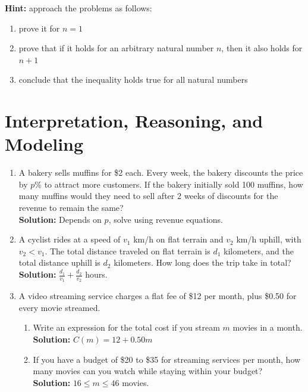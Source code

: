 \documentclass{article}
\begin{document}
\textbf{Hint:} approach the problems as follows:
\begin{enumerate}[leftmargin = 0.5cm, label = \arabic*., rightmargin = 0.2cm]
    \item prove it for $n = 1$
    \item prove that if it holds for an arbitrary natural number $n$, then it also holds for $n+1$
    \item conclude that the inequality holds true for all natural numbers
\end{enumerate}

\section{Interpretation, Reasoning, and Modeling}

\begin{enumerate}[leftmargin = 0.5cm, label = \arabic*., rightmargin = 0.2cm]

    \item A bakery sells muffins for \$2 each. Every week, the bakery discounts the price by $p\%$ to attract more customers. If the bakery initially sold 100 muffins, how many muffins would they need to sell after 2 weeks of discounts for the revenue to remain the same? \\
    \textbf{Solution:} Depends on $p$, solve using revenue equations.

    \item A cyclist rides at a speed of $v_1$ km/h on flat terrain and $v_2$ km/h uphill, with $v_2 < v_1$. The total distance traveled on flat terrain is $d_1$ kilometers, and the total distance uphill is $d_2$ kilometers. How long does the trip take in total? \\
    \textbf{Solution:} \( \frac{d_1}{v_1} + \frac{d_2}{v_2} \) hours.

    \item A video streaming service charges a flat fee of \$12 per month, plus \$0.50 for every movie streamed.
    \begin{enumerate}[leftmargin = 0.5cm, label = (\alph*), rightmargin = 0.2cm]
        \item Write an expression for the total cost if you stream $m$ movies in a month. \\
        \textbf{Solution:} \( C(m) = 12 + 0.50m \)
        
        \item If you have a budget of \$20 to \$35 for streaming services per month, how many movies can you watch while staying within your budget? \\
        \textbf{Solution:} $16 \leq m \leq 46$ movies.
    \end{enumerate}


\end{enumerate}
\end{document}
